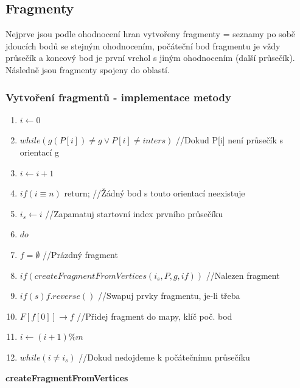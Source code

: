 \documentclass[a4paper, 12pt]{article}
\begin{document}
\clearpage

\subsection{Fragmenty}
Nejprve jsou podle ohodnocení hran vytvořeny fragmenty = seznamy po sobě jdoucích bodů se stejným ohodnocením, počáteční bod fragmentu je vždy průsečík a koncový bod je první vrchol s jiným ohodnocením (další průsečík). Následně jsou fragmenty spojeny do oblastí.

\subsubsection{Vytvoření fragmentů - implementace metody}
\begin{enumerate}
	\item $ i \longleftarrow 0 $
	\item $ while (g(P[i]) \neq g \vee P[i] \neq inters) $ //Dokud P[i] není průsečík s orientací g
	\item \hspace{1cm} $ i \longleftarrow i+1 $
	\item $ if (i\equiv n) $ return; //Žádný bod s touto orientací neexistuje
	\item $ i_s \longleftarrow i $ //Zapamatuj startovní index prvního průsečíku
	\item $ do $
	\item \hspace{1cm} $ f = \emptyset $ //Prázdný fragment
	\item \hspace{1cm} $ if (createFragmentFromVertices (i_s, P, g, i f)) $ //Nalezen fragment
	\item \hspace{2cm} $ if (s) f.reverse() $ //Swapuj prvky fragmentu, je-li třeba
	\item \hspace{2cm} $ F[f[0]] \longrightarrow f $ //Přidej fragment do mapy, klíč poč. bod
	\item \hspace{1cm} $ i \longleftarrow (i+1)\%m $
	\item $ while (i \neq i_s) $ //Dokud nedojdeme k počátečnímu průsečíku
\end{enumerate}

\vspace{1cm}

\textbf{createFragmentFromVertices}
\end{document}
